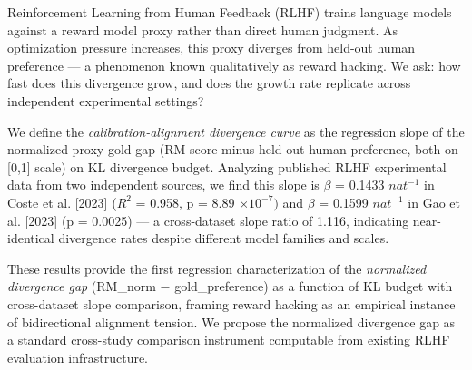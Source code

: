 
Reinforcement Learning from Human Feedback (RLHF) trains language models against a reward model proxy rather than direct human judgment. As optimization pressure increases, this proxy diverges from held-out human preference --- a phenomenon known qualitatively as reward hacking. We ask: how fast does this divergence grow, and does the growth rate replicate across independent experimental settings?

We define the \textit{calibration-alignment divergence curve} as the regression slope of the normalized proxy-gold gap (RM score minus held-out human preference, both on [0,1] scale) on KL divergence budget. Analyzing published RLHF experimental data from two independent sources, we find this slope is $\beta$ = 0.1433 $nat^{-1}$ in Coste et al. [2023] ($R^2$ = 0.958, p = 8.89 $\times 10^{-7})$ and $\beta$ = 0.1599 $nat^{-1}$ in Gao et al. [2023] (p = 0.0025) --- a cross-dataset slope ratio of 1.116, indicating near-identical divergence rates despite different model families and scales.

These results provide the first regression characterization of the \textit{normalized divergence gap} (RM\_norm $-$ gold\_preference) as a function of KL budget with cross-dataset slope comparison, framing reward hacking as an empirical instance of bidirectional alignment tension. We propose the normalized divergence gap as a standard cross-study comparison instrument computable from existing RLHF evaluation infrastructure.

